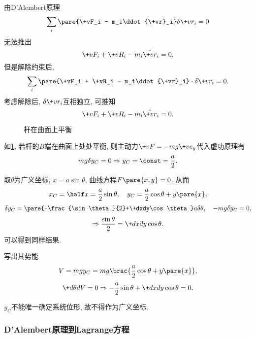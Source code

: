 \documentclass{ctexart}
\begin{document}
\begin{remark}
    由D'Alembert原理
    \[ \sum_i \pare{\+vF_i - m_i\ddot{\+vr}_i}\delta \+vr_i = 0 \]
    无法推出
    \[ \+vF_i + \+vR_i - m_i\ddot{\+vr}_i = 0. \]
    但是解除约束后,
    \[ \sum_i \pare{\+vF_i + \+vR_i - m_i\ddot{\+vr}_i}\cdot\delta\+vr_i = 0. \]
    考虑解除后, $\delta \+vr_i$互相独立, 可推知
    \[ \+vF_i + \+vR_i - m_i\ddot{\+vr}_i = 0. \]
\end{remark}

\begin{figure}[ht]
    \centering
    \caption{杆在曲面上平衡}
    \label{fig:杆在曲面上平衡}
\end{figure}
\begin{sample}
    \begin{ex}
        如\cref{fig:杆在曲面上平衡}, 若杆的$B$端在曲面上处处平衡, 则主动力$\+vF = -mg\+ve_y$代入虚功原理有
        \[ mg\delta y_C = 0 \Rightarrow y_C = \const = \frac{a}{2}. \]
    \end{ex}
    \begin{ex}
        取$\theta$为广义坐标, $x = a\sin\theta$, 曲线方程$F\pare{x,y} = 0$. 从而
        \[ x_C = \half x = \frac{a}{2}\sin\theta,\quad y_C = \frac{a}{2}\cos\theta + y\pare{x}, \]
        \[ \delta y_C = \pare{-\frac{\sin\theta}{2}+\+dxdy\cos\theta}a\delta\theta,\quad -mg\delta y_C = 0, \]
        \[ \Rightarrow \frac{\sin\theta}{2} = \+dxdy \cos\theta. \]
        可以得到同样结果.
    \end{ex}
    \begin{ex}
        写出其势能
        \[ V = mgy_C = mg\brac{\frac{a}{2}\cos\theta + y\pare{x}}, \]
        \[ \+d\theta dV = 0\Rightarrow -\frac{a}{2}\sin\theta + \+dxdy\cos\theta = 0. \]
    \end{ex}
\end{sample}
\begin{remark}
    $y_C$不能唯一确定系统位形, 故不得作为广义坐标.
\end{remark}


\subsubsection{D'Alembert原理到Lagrange方程} %
\label{ssub:d_alembert原理到lagrange方程}
\end{document}
